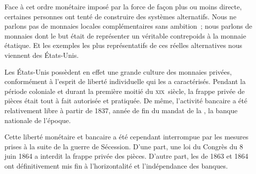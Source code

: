 Face à cet ordre monétaire imposé par la force de façon plus ou moins directe, certaines personnes ont tenté de construire des systèmes alternatifs. Nous ne parlons pas de monnaies locales complémentaires sans ambition~; nous parlons de monnaies dont le but était de représenter un véritable contrepoids à la monnaie étatique. Et les exemples les plus représentatifs de ces réelles alternatives nous viennent des États-Unis.

Les États-Unis possèdent en effet une grande culture des monnaies privées, conformément à l'esprit de liberté individuelle qui les a caractérisés. Pendant la période coloniale et durant la première moitié du \textsc{xix}\ieme{}~siècle, la frappe privée de pièces était tout à fait autorisée et pratiquée. De même, l'activité bancaire a été relativement libre à partir de 1837, année de fin du mandat de la , la banque nationale de l'époque.

Cette liberté monétaire et bancaire a été cependant interrompue par les mesures prises à la suite de la guerre de Sécession. D'une part, une loi du Congrès du 8 juin 1864 a interdit la frappe privée des pièces. D'autre part, les  de 1863 et 1864 ont définitivement mis fin à l'horizontalité et l'indépendance des banques.

